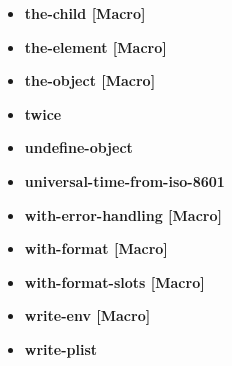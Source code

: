 \documentclass [11pt]{book}
\begin{document}
\begin{itemize}
\item {}
\label{prim:the-child}
\textbf{the-child [Macro]}





\item {}
\label{prim:the-element}
\textbf{the-element [Macro]}





\item {}
\label{prim:the-object}
\textbf{the-object [Macro]}





\item {}
\label{prim:twice}
\textbf{twice}





\item {}
\label{prim:undefine-object}
\textbf{undefine-object}





\item {}
\label{prim:universal-time-from-iso-8601}
\textbf{universal-time-from-iso-8601}





\item {}
\label{prim:with-error-handling}
\textbf{with-error-handling [Macro]}





\item {}
\label{prim:with-format}
\textbf{with-format [Macro]}





\item {}
\label{prim:with-format-slots}
\textbf{with-format-slots [Macro]}





\item {}
\label{prim:write-env}
\textbf{write-env [Macro]}





\item {}
\label{prim:write-plist}
\textbf{write-plist}






\end{itemize}
\end{document}
